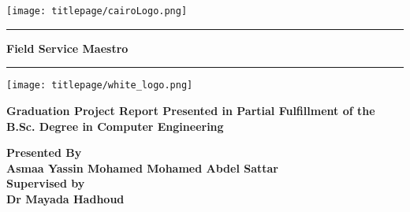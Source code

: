 \documentclass[12pt,a4paper]{report}
\begin{document}
\pagecolor[RGB]{52,122,42}

\newcommand{\HRule}{\rule{\linewidth}{0.5mm}}
\begin{titlepage}
	\begin{center}
			\centering
			\texttt{[image: titlepage/cairoLogo.png]}

		\Huge
		\HRule
		
		\textbf{Field Service Maestro}
		\HRule
		
		\vspace*{0.5cm}
		\centering
		\texttt{[image: titlepage/white\_logo.png]}
		
		\vspace*{.5cm}
		\Large
		\textbf{ Graduation Project Report Presented in
Partial Fulfillment of the B.Sc. Degree in Computer Engineering}

		\large
		\vspace*{1.5cm}
		{\textbf{Presented By}}\\
		\Large \textbf{
		{Asmaa Yassin Mohamed}
		\hfill
		{Mohamed Abdel Sattar}\\
		}
		\vspace*{1.5cm}
		{\textbf {\large Supervised by}}\\
		\textbf{\LARGE Dr Mayada Hadhoud}\\
		\vfill
		{\textbf{\the\year}}
	\end{center}
\end{titlepage}
\end{document}
